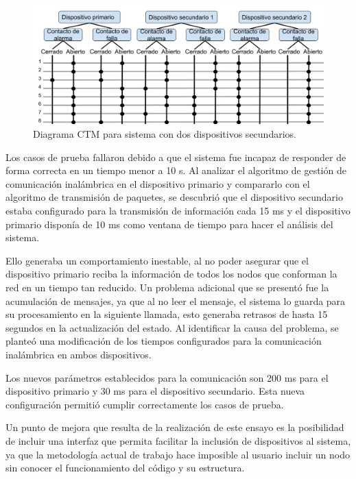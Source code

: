 \begin{figure}[ht]
	\centering
	\includegraphics[scale=.35]{./Figures/Capitulo4/Figura_L.png}
	\caption{Diagrama CTM para sistema con dos dispositivos secundarios.}
	\label{fig:figura_l}
\end{figure}

Los casos de prueba fallaron debido a que el sistema fue incapaz de responder de forma correcta en un tiempo menor a 10 s. Al analizar el algoritmo de gestión de comunicación inalámbrica en el dispositivo primario y compararlo con el algoritmo de transmisión de paquetes, se descubrió que el dispositivo secundario estaba configurado para la transmisión de información cada 15 ms y el dispositivo primario disponía de 10 ms como ventana de tiempo para hacer el análisis del sistema. 

Ello generaba un comportamiento inestable, al no poder asegurar que el dispositivo primario reciba la información de todos los nodos que conforman la red en un tiempo tan reducido. Un problema adicional que se presentó fue la acumulación de mensajes, ya que al no leer el mensaje, el sistema lo guarda para su procesamiento en la siguiente llamada, esto generaba retrasos de hasta 15 segundos en la actualización del estado. Al identificar la causa del problema, se planteó una modificación de los tiempos configurados para la comunicación inalámbrica en ambos dispositivos. 

Los nuevos parámetros establecidos para la comunicación son 200 ms para el dispositivo primario y 30 ms para el dispositivo secundario. Esta nueva configuración permitió cumplir correctamente los casos de prueba.

      
Un punto de mejora que resulta de la realización de este ensayo es la posibilidad de incluir una interfaz que permita facilitar la inclusión de dispositivos al sistema, ya que la metodología actual de trabajo hace imposible al usuario incluir un nodo sin conocer el funcionamiento del código y su estructura.

